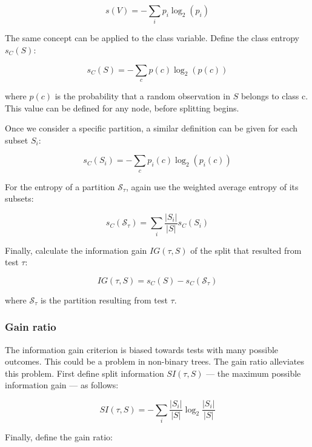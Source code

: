 \begin{equation}
    s(V) = - \sum_i p_i \log_2(p_i)
\end{equation}

The same concept can be applied to the class variable. Define the class entropy $s_C(S)$:

\begin{equation}
    s_C(S) = - \sum_c p(c) \log_2(p(c))
\end{equation}

where $p(c)$ is the probability that a random observation in $S$ belongs to class c. This value can be defined for any node, before splitting begins.

Once we consider a specific partition, a similar definition can be given for each subset $S_i$:

\begin{equation}
    s_C(S_i) = - \sum_c p_i(c) \log_2(p_i(c))
\end{equation}

For the entropy of a partition $\mathcal{S}_\tau$, again use the weighted average entropy of its subsets:

\begin{equation}
    s_C(\mathcal{S}_\tau) = \sum_i \frac{|S_i|}{|S|} s_C(S_i)
\end{equation}

Finally, calculate the information gain $IG(\tau, S)$ of the split that resulted from test $\tau$:

\begin{equation}
    IG(\tau, S) = s_C(S) - s_C(\mathcal{S}_\tau)
\end{equation}

where $\mathcal{S}_\tau$ is the partition resulting from test $\tau$.

\subsubsection{Gain ratio}
The information gain criterion is biased towards tests with many possible outcomes. This could be a problem in non-binary trees. The gain ratio alleviates this problem. First define split information $SI(\tau, S)$ --- the maximum possible information gain --- as follows:

\begin{equation}
    SI(\tau, S) = - \sum_i \frac{|S_i|}{|S|} \log_2 \frac{|S_i|}{|S|}
\end{equation}

Finally, define the gain ratio:

